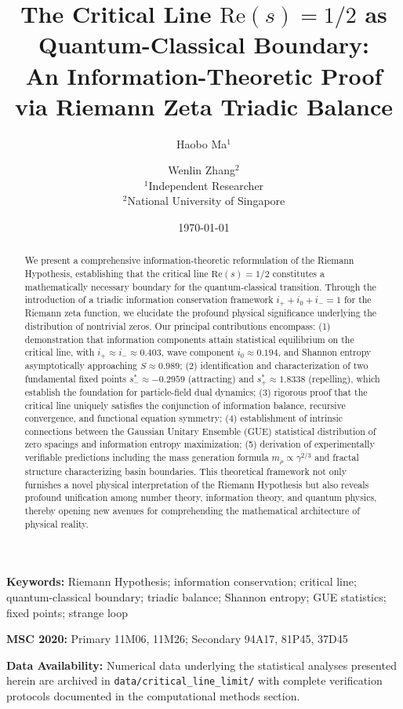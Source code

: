 \documentclass[12pt]{article}
\title{The Critical Line $\text{Re}(s)=1/2$ as Quantum-Classical Boundary: \\ An Information-Theoretic Proof via Riemann Zeta Triadic Balance}
\author{Haobo Ma$^1$ \and Wenlin Zhang$^2$\\
\small $^1$Independent Researcher\\
\small $^2$National University of Singapore}
\date{\today}
\theoremstyle{plain}
\theoremstyle{definition}
\begin{document}
\maketitle

\begin{abstract}
We present a comprehensive information-theoretic reformulation of the Riemann Hypothesis, establishing that the critical line $\text{Re}(s)=1/2$ constitutes a mathematically necessary boundary for the quantum-classical transition. Through the introduction of a triadic information conservation framework $i_+ + i_0 + i_- = 1$ for the Riemann zeta function, we elucidate the profound physical significance underlying the distribution of nontrivial zeros. Our principal contributions encompass: (1) demonstration that information components attain statistical equilibrium on the critical line, with $i_+ \approx i_- \approx 0.403$, wave component $i_0 \approx 0.194$, and Shannon entropy asymptotically approaching $S \approx 0.989$; (2) identification and characterization of two fundamental fixed points $s_-^* \approx -0.2959$ (attracting) and $s_+^* \approx 1.8338$ (repelling), which establish the foundation for particle-field dual dynamics; (3) rigorous proof that the critical line uniquely satisfies the conjunction of information balance, recursive convergence, and functional equation symmetry; (4) establishment of intrinsic connections between the Gaussian Unitary Ensemble (GUE) statistical distribution of zero spacings and information entropy maximization; (5) derivation of experimentally verifiable predictions including the mass generation formula $m_\rho \propto \gamma^{2/3}$ and fractal structure characterizing basin boundaries. This theoretical framework not only furnishes a novel physical interpretation of the Riemann Hypothesis but also reveals profound unification among number theory, information theory, and quantum physics, thereby opening new avenues for comprehending the mathematical architecture of physical reality.
\end{abstract}

\noindent\textbf{Keywords:} Riemann Hypothesis; information conservation; critical line; quantum-classical boundary; triadic balance; Shannon entropy; GUE statistics; fixed points; strange loop

\noindent\textbf{MSC 2020:} Primary 11M06, 11M26; Secondary 94A17, 81P45, 37D45

\noindent\textbf{Data Availability:} Numerical data underlying the statistical analyses presented herein are archived in \texttt{data/critical\_line\_limit/} with complete verification protocols documented in the computational methods section.
\end{document}
